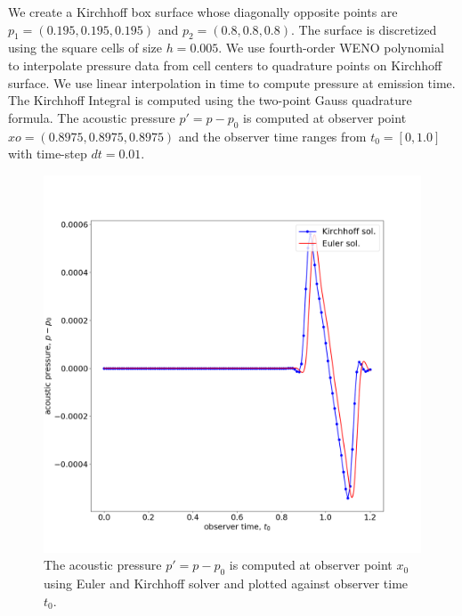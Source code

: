 \documentclass[a4paper]{article}
\begin{document}
We create a Kirchhoff box surface whose diagonally opposite points are $p_{1} = (0.195, 0.195, 0.195)$
and $p_{2} = (0.8, 0.8, 0.8)$. The surface is discretized using the square cells of size $h = 0.005$. We use fourth-order WENO polynomial to interpolate pressure data from cell centers to quadrature points on Kirchhoff surface. We use linear interpolation in time to compute pressure at emission time. The Kirchhoff Integral is computed using the two-point Gauss quadrature formula. The acoustic pressure $p' = p - p_{0}$ is computed at observer point $xo = (0.8975,0.8975,0.8975)$ and the observer time ranges from $t_{0} = [0,1.0]$ with time-step $dt = 0.01$.
\begin{figure}[h!]\label{result}
	\centering
	\includegraphics[scale=.23]{images/Pressure2.png}
	\caption{The acoustic pressure $p' = p - p_{0}$ is computed at observer point $x_{0}$ using Euler and Kirchhoff solver and plotted against observer time $t_{0}$.}
\end{figure}
\printbibliography
\end{document}
